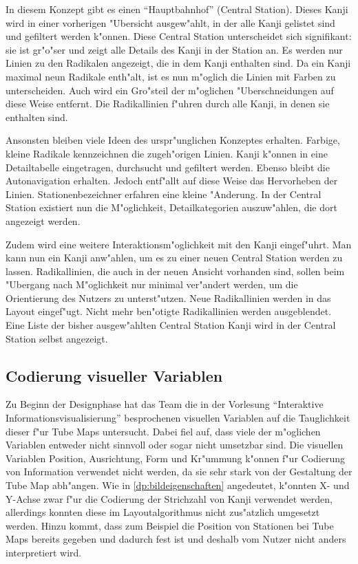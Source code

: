 In diesem Konzept gibt es einen "`Hauptbahnhof"' (Central Station). Dieses Kanji wird in einer vorherigen "Ubersicht ausgew"ahlt, in der alle Kanji gelistet sind und gefiltert werden k"onnen. Diese Central Station unterscheidet sich signifikant: sie ist gr"o"ser und zeigt alle Details des Kanji in der Station an. Es werden nur Linien zu den Radikalen angezeigt, die in dem Kanji enthalten sind. Da ein Kanji maximal neun Radikale enth"alt, ist es nun m"oglich die Linien mit Farben zu unterscheiden. Auch wird ein Gro"steil der m"oglichen "Uberschneidungen auf diese Weise entfernt. Die Radikallinien f"uhren durch alle Kanji, in denen sie enthalten sind.

Ansonsten bleiben viele Ideen des urspr"unglichen Konzeptes erhalten. Farbige, kleine Radikale kennzeichnen die zugeh"origen Linien. Kanji k"onnen in eine Detailtabelle eingetragen, durchsucht und gefiltert werden. Ebenso bleibt die Autonavigation erhalten. Jedoch entf"allt auf diese Weise das Hervorheben der Linien. Stationenbezeichner erfahren eine kleine "Anderung. In der Central Station existiert nun die M"oglichkeit, Detailkategorien auszuw"ahlen, die dort angezeigt werden. 

Zudem wird eine weitere Interaktionsm"oglichkeit mit den Kanji eingef"uhrt. Man kann nun ein Kanji anw"ahlen, um es zu einer neuen Central Station werden zu lassen. Radikallinien, die auch in der neuen Ansicht vorhanden sind, sollen beim "Ubergang nach M"oglichkeit nur minimal ver"andert werden, um die Orientierung des Nutzers zu unterst"utzen. Neue Radikallinien werden in das Layout eingef"ugt. Nicht mehr ben"otigte Radikallinien werden ausgeblendet. Eine Liste der bisher ausgew"ahlten Central Station Kanji wird in der Central Station selbst angezeigt.

\subsection{Codierung visueller Variablen}
Zu Beginn der Designphase hat das Team die in der Vorlesung "`Interaktive Informationsvisualisierung"' besprochenen visuellen Variablen auf die Tauglichkeit dieser f"ur Tube Maps untersucht. Dabei fiel auf, dass viele der m"oglichen Variablen entweder nicht sinnvoll oder sogar nicht umsetzbar sind. Die visuellen Variablen Position, Ausrichtung, Form und Kr"ummung k"onnen f"ur Codierung von Information verwendet nicht werden, da sie sehr stark von der Gestaltung der Tube Map abh"angen. Wie in \ref{dp:bildeigenschaften} angedeutet, k"onnten X- und Y-Achse zwar f"ur die Codierung der Strichzahl von Kanji verwendet werden, allerdings konnten diese im Layoutalgorithmus nicht zus"atzlich umgesetzt werden. Hinzu kommt, dass zum Beispiel die Position von Stationen bei Tube Maps bereits gegeben und dadurch fest ist und deshalb vom Nutzer nicht anders interpretiert wird.

